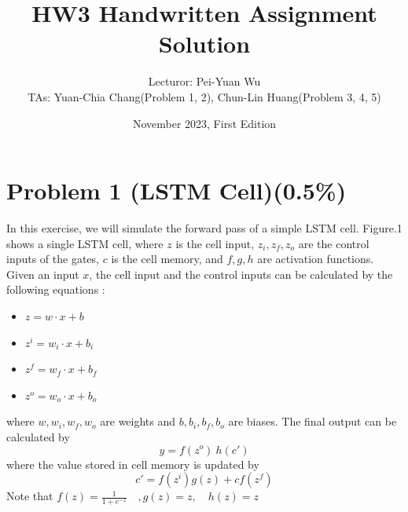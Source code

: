 \documentclass{article}
\title{HW3 Handwritten Assignment Solution}
\author{Lecturor: Pei-Yuan Wu\\
TAs: {Yuan-Chia Chang(Problem 1, 2), Chun-Lin Huang(Problem 3, 4, 5)}}
\date{November 2023, First Edition}
\begin{document}
\maketitle

\section*{Problem 1 (LSTM Cell)(0.5\%)}
In this exercise, we will simulate the forward pass of a simple LSTM cell. Figure.1 shows a single LSTM cell, where $z$ is the cell input, $z_i, z_f, z_o$ are the control inputs of the gates, $c$ is the cell memory, and $f, g, h$ are activation functions. Given an input $x$, the cell input and the control inputs can be calculated by the following equations :
\begin{itemize}
    \item $z = w \cdot x + b$
    \item $z^i = w_i \cdot x + b_i$
    \item $z^f = w_f \cdot x + b_f$
    \item $z^o = w_o \cdot x + b_o$
\end{itemize}
where $w, w_i, w_f, w_o$ are weights and $b, b_i, b_f, b_o$ are biases. The final output can be calculated by
$$y = f(z^o)\ h(c')$$
where the value stored in cell memory is updated by
$$c'=f(z^i)g(z)+cf(z^f)$$
Note that $f(z) = \frac{1}{1+e^{-z}}\quad , g(z) = z,\quad h(z) = z$
\end{document}
